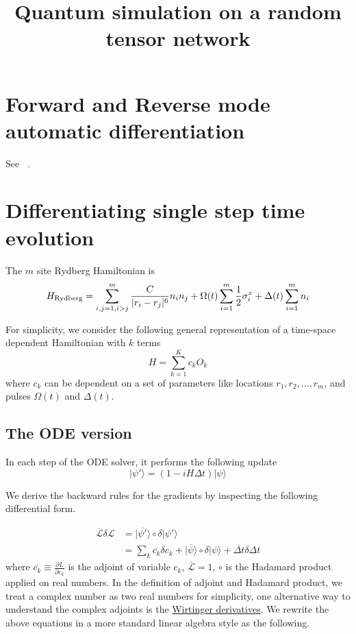 \documentclass{article}
\title{Quantum simulation on a random tensor network}
\theoremstyle{definition}
\begin{document}
\maketitle

\section{Forward and Reverse mode automatic differentiation}
See ~\cite{Griewank2008,Hascoet2013}.
\section{Differentiating single step time evolution}
The $m$ site Rydberg Hamiltonian is
\begin{equation}
    H_{\rm Rydberg} = \sum_{i,j=1, i>j}^{m} \frac{C}{|r_i-r_j|^6}n_i n_j + \Omega(t)\sum_{i=1}^{m} \frac{1}{2}\sigma_i^x + \Delta(t)\sum_{i=1}^{m} n_i
\end{equation}

For simplicity, we consider the following general representation of a time-space dependent Hamiltonian with $k$ terms
\begin{equation}
    H = \sum_{k=1}^{K} c_k O_k
\end{equation}
where $c_k$ can be dependent on a set of parameters like locations $r_1, r_2, \ldots, r_m$, and pulses $\Omega(t)$ and $\Delta(t)$.

\subsection{The ODE version}
In each step of the ODE solver, it performs the following update
\begin{equation}
    |\psi'\rangle = (1 - iH \Delta t) |\psi\rangle
\end{equation}

We derive the backward rules for the gradients by inspecting the following
differential form.

\begin{equation}\label{eq:ad0}
    \begin{split}
    \overline{\mathcal{L}}\delta \mathcal{L} &= \overline{|\psi'\rangle} \circ \delta |\psi'\rangle\\
    &= \sum_k \overline{c_k} \delta c_k + \overline{|\psi\rangle}\circ\delta|\psi\rangle + \overline{\Delta t}\delta \Delta t
    \end{split}
\end{equation}
where $\overline{c_k} \equiv \frac{\partial L} {\partial c_k}$ is the adjoint of variable $c_k$, $\overline{\mathcal{L}} = 1$, $\circ$ is the Hadamard product applied on real numbers.
In the definition of adjoint and Hadamard product, we treat a complex number as two real numbers for simplicity, one alternative way to understand the complex adjoints is the \href{https://en.wikipedia.org/wiki/Wirtinger_derivatives}{Wirtinger derivatives}.
We rewrite the above equations in a more standard linear algebra style as the following.
\end{document}

